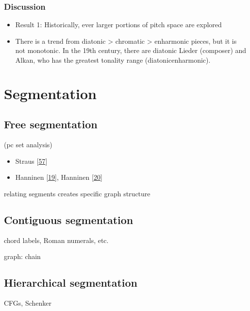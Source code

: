 \documentclass[letterpaper,10pt,english]{sphinxmanual}
\begin{document}
\subsection{Discussion}
\label{\detokenize{topic_modeling:discussion}}\begin{itemize}
\item {} 
\sphinxAtStartPar
Result 1: Historically, ever larger portions of pitch space are explored

\item {} 
\sphinxAtStartPar
There is a trend from diatonic \textgreater{} chromatic \textgreater{} enharmonic pieces, but it
is not monotonic. In the 19th century, there are diatonic Lieder
(composer) and Alkan, who has the greatest tonality range
(diatonic\sphinxhyphen{}enharmonic).

\end{itemize}


\chapter{Segmentation}
\label{\detokenize{5_segmentation:segmentation}}\label{\detokenize{5_segmentation::doc}}

\section{Free segmentation}
\label{\detokenize{5_segmentation:free-segmentation}}
\sphinxAtStartPar
(pc set analysis)
\begin{itemize}
\item {} 
\sphinxAtStartPar
Straus {[}\hyperlink{cite.8_bibliography:id3}{57}{]}

\item {} 
\sphinxAtStartPar
Hanninen {[}\hyperlink{cite.8_bibliography:id52}{19}{]}, Hanninen {[}\hyperlink{cite.8_bibliography:id53}{20}{]}

\end{itemize}

\sphinxAtStartPar
relating segments creates specific graph structure


\section{Contiguous segmentation}
\label{\detokenize{5_segmentation:contiguous-segmentation}}
\sphinxAtStartPar
chord labels, Roman numerals, etc.

\sphinxAtStartPar
graph: chain


\section{Hierarchical segmentation}
\label{\detokenize{5_segmentation:hierarchical-segmentation}}
\sphinxAtStartPar
CFGs, Schenker
\end{document}
